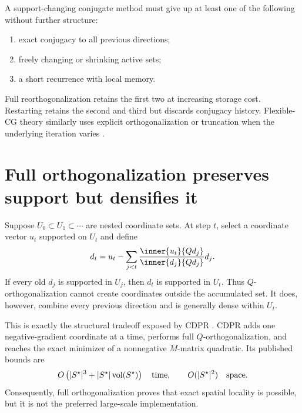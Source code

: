 \documentclass[11pt]{article}
\begin{document}
\begin{remark}
A support-changing conjugate method must give up at least one of the
following without further structure:
\begin{enumerate}[leftmargin=*]
 \item exact conjugacy to all previous directions;
 \item freely changing or shrinking active sets;
 \item a short recurrence with local memory.
\end{enumerate}
Full reorthogonalization retains the first two at increasing storage cost.
Restarting retains the second and third but discards conjugacy history.
Flexible-CG theory similarly uses explicit orthogonalization or truncation
when the underlying iteration varies \citep{notay2000flexible}.
\end{remark}

\section{Full orthogonalization preserves support but densifies it}
\label{sec:full-orthogonalization}

Suppose $U_0\subset U_1\subset\cdots$ are nested coordinate sets. At step
$t$, select a coordinate vector $u_t$ supported on $U_t$ and define
\begin{equation}
 d_t=u_t-\sum_{j<t}
 \frac{\inner{u_t}{Qd_j}}{\inner{d_j}{Qd_j}}d_j.
 \label{eq:gram-schmidt}
\end{equation}
If every old $d_j$ is supported in $U_j$, then $d_t$ is supported in $U_t$.
Thus $Q$-orthogonalization cannot create coordinates outside the accumulated
set. It does, however, combine every previous direction and is generally
dense within $U_t$.

This is exactly the structural tradeoff exposed by CDPR
\citep{martinezrubio2023accelerated}. CDPR adds one negative-gradient
coordinate at a time, performs full $Q$-orthogonalization, and reaches the
exact minimizer of a nonnegative $M$-matrix quadratic. Its published bounds
are
\begin{equation}
 O\left(|S^\star|^3+|S^\star|\operatorname{vol}(S^\star)\right)
 \quad\text{time},
 \qquad
 O(|S^\star|^2)
 \quad\text{space}.
 \label{eq:cdpr-cost}
\end{equation}
Consequently, full orthogonalization proves that exact spatial locality is
possible, but it is not the preferred large-scale implementation.
\end{document}
